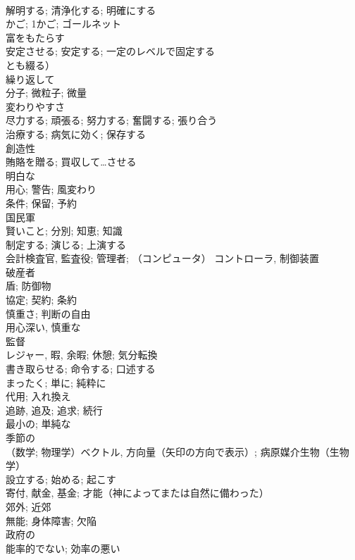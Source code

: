 \documentclass[8pt]{extreport}
\begin{document}
\begin{CJK}{UTF8}{min}
\\	解明する; 清浄化する; 明確にする	
\\	かご; 1かご; ゴールネット	
\\	富をもたらす	
\\	安定させる; 安定する; 一定のレベルで固定する
\\	とも綴る）	
\\	繰り返して	
\\	分子; 微粒子; 微量	
\\	変わりやすさ	
\\	尽力する; 頑張る; 努力する; 奮闘する; 張り合う	
\\	治療する; 病気に効く; 保存する	
\\	創造性	
\\	賄賂を贈る; 買収して…させる	
\\	明白な	
\\	用心; 警告; 風変わり	
\\	条件; 保留; 予約	
\\	国民軍	
\\	賢いこと; 分別; 知恵; 知識	
\\	制定する; 演じる; 上演する	
\\	会計検査官, 監査役; 管理者; （コンピュータ） コントローラ, 制御装置	
\\	破産者	
\\	盾; 防御物	
\\	協定; 契約; 条約	
\\	慎重さ; 判断の自由	
\\	用心深い, 慎重な	
\\	監督	
\\	レジャー, 暇, 余暇; 休憩; 気分転換	
\\	書き取らせる; 命令する; 口述する	
\\	まったく; 単に; 純粋に	
\\	代用; 入れ換え	
\\	追跡, 追及; 追求; 続行	
\\	最小の; 単純な	
\\	季節の	
\\	（数学; 物理学）ベクトル, 方向量（矢印の方向で表示）; 病原媒介生物（生物学）	
\\	設立する; 始める; 起こす	
\\	寄付, 献金, 基金; 才能（神によってまたは自然に備わった）	
\\	郊外; 近郊	
\\	無能; 身体障害; 欠陥	
\\	政府の	
\\	能率的でない; 効率の悪い	

\end{CJK}
\end{document}
